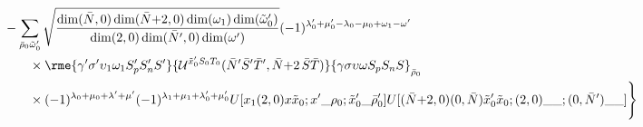 \documentclass[%
  aps,%
  prc,%
  showpacs,%
  superscriptaddress,%
  onecolumn,%
  notitlepage,%
  11pt,%
  floatfix,%
  amsmath,%
  amssymb,%
]{revtex4-2}
\newcommand{\plus}{\text{+}}
\begin{document}
\begin{align*}
  &\qquad-\sum_{\bar{\rho}_0\tilde{\omega}_0'}
  \sqrt{\frac{\dim(\bar{N},0)\dim(\bar{N}\plus2,0)\dim(\omega_1)\dim(\tilde{\omega}_0')}{\dim(2,0)\dim(\bar{N}',0)\dim(\omega')}}
  (-1)^{\lambda_0'+\mu_0'-\lambda_0-\mu_0+\omega_1-\omega'}
  \\
  & \qquad \qquad \times
  \rme{\gamma'\sigma'\upsilon_1\omega_1S_p'S_n'S'}{\mathcal{U}^{\tilde{x}_0' S_0 T_0}(\bar{N}'\bar{S}'\bar{T}',\bar{N}\plus2\,\bar{S}\bar{T})}{\gamma \sigma \upsilon \omega S_p S_n S}_{\bar{\rho}_0}\\
  &\qquad\qquad\times
      (-1)^{\lambda_0+\mu_0+\lambda'+\mu'}(-1)^{\lambda_1+\mu_1+\lambda_0'+\mu_0'} U[x_1 (2,0) x \tilde{x}_0; x'\_\rho_0;\tilde{x}_0'\_\bar{\rho}_0']
      U[(\bar{N}\plus2,0)(0,\bar{N}) \tilde{x}_0' \tilde{x}_0;(2,0)\_\_;(0,\bar{N}')\_\_] \Bigg\}
\end{align*}
\clearpage
\end{document}
